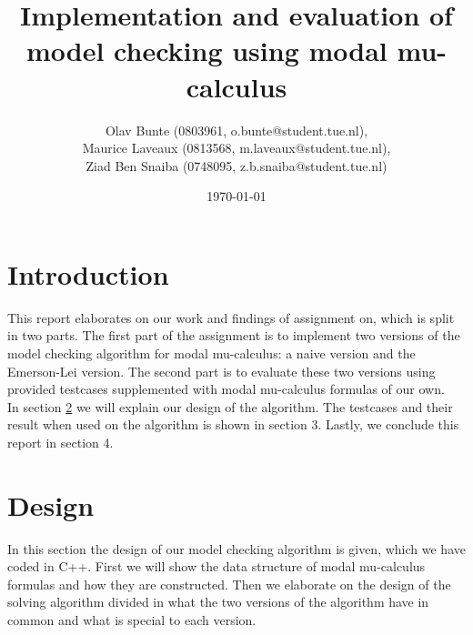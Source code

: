 \documentclass[10pt,a4paper]{article}
\title{Implementation and evaluation of model checking using modal mu-calculus}
\author{Olav Bunte (0803961, o.bunte@student.tue.nl),\\
Maurice Laveaux (0813568, m.laveaux@student.tue.nl),\\
Ziad Ben Snaiba (0748095, z.b.snaiba@student.tue.nl)}
\date{\today}
\begin{document}
\maketitle

\section{Introduction}
This report elaborates on our work and findings of assignment on, which is split in two parts. The first part of the assignment is to implement two versions of the model checking algorithm for modal mu-calculus: a naive version and the Emerson-Lei version. The second part is to evaluate these two versions using provided testcases supplemented with modal mu-calculus formulas of our own.\\
In section \ref{design} we will explain our design of the algorithm. The testcases and their result when used on the algorithm is shown in section 3. Lastly, we conclude this report in section 4.

\section{Design}\label{design}
In this section the design of our model checking algorithm is given, which we have coded in C++. First we will show the data structure of modal mu-calculus formulas and how they are constructed. Then we elaborate on the design of the solving algorithm divided in what the two versions of the algorithm have in common and what is special to each version.

\end{document}
